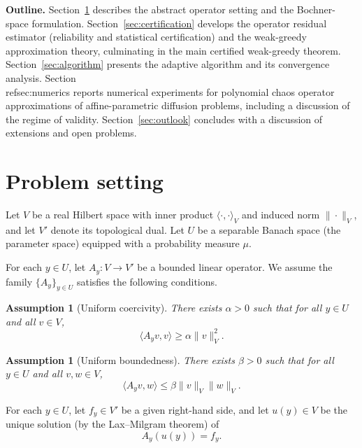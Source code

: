 \documentclass[a4paper,11pt]{article}
\theoremstyle{plain}
\newtheorem{assumption}[theorem]{Assumption}
\theoremstyle{definition}
\newcommand{\inner}[2]{\langle#1,#2\rangle}
\newcommand{\norm}[1]{\|#1\|}
\begin{document}
\textbf{Outline.}
Section~\ref{sec:setting} describes the abstract operator setting and the Bochner-space formulation.
Section~\ref{sec:certification} develops the operator residual estimator (reliability and statistical certification) and the weak-greedy approximation theory, culminating in the main certified weak-greedy theorem.
Section~\ref{sec:algorithm} presents the adaptive algorithm and its convergence analysis.
Section~\\ref{sec:numerics} reports numerical experiments for polynomial chaos operator approximations of affine-parametric diffusion problems, including a discussion of the regime of validity.
Section~\ref{sec:outlook} concludes with a discussion of extensions and open problems.

\section{Problem setting}
\label{sec:setting}

Let $V$ be a real Hilbert space with inner product $\inner{\cdot}{\cdot}_V$ and induced norm $\norm{\cdot}_V$, and let $V'$ denote its topological dual.
Let $U$ be a separable Banach space (the parameter space) equipped with a probability measure $\mu$.

For each $y\in U$, let $A_y:V\to V'$ be a bounded linear operator.
We assume the family $\{A_y\}_{y\in U}$ satisfies the following conditions.

\begin{assumption}[Uniform coercivity]
\label{ass:coercivity}
There exists $\alpha>0$ such that for all $y\in U$ and all $v\in V$,
\[
\inner{A_y v}{v} \ge \alpha \|v\|_V^2.
\]
\end{assumption}

\begin{assumption}[Uniform boundedness]
\label{ass:boundedness}
There exists $\beta>0$ such that for all $y\in U$ and all $v,w\in V$,
\[
\inner{A_y v}{w} \le \beta \|v\|_V \|w\|_V.
\]
\end{assumption}

For each $y\in U$, let $f_y\in V'$ be a given right-hand side, and let $u(y)\in V$ be the unique solution (by the Lax--Milgram theorem) of
\begin{equation}
\label{eq:PDE}
A_y(u(y)) = f_y.
\end{equation}
\end{document}
